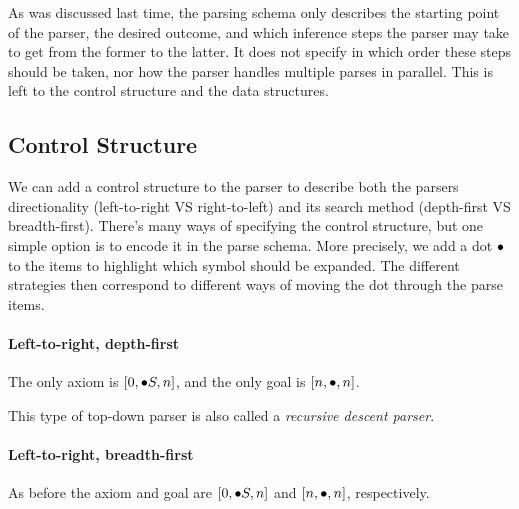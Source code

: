 As was discussed last time, the parsing schema only describes the starting point of the parser, the desired outcome, and which inference steps the parser may take to get from the former to the latter.
It does not specify in which order these steps should be taken, nor how the parser handles multiple parses in parallel.
This is left to the control structure and the data structures.

\subsection{Control Structure}
\label{sub:TopDown_Control}
We can add a control structure to the parser to describe both the parsers directionality (left-to-right VS right-to-left) and its search method (depth-first VS breadth-first).
There's many ways of specifying the control structure, but one simple option is to encode it in the parse schema.
More precisely, we add a dot $\psep$ to the items to highlight which symbol should be expanded.
The different strategies then correspond to different ways of moving the dot through the parse items.

\paragraph{Left-to-right, depth-first}
The only axiom is $[0,\psep S, n]$, and the only goal is $[n,\psep,n]$.
%
\begin{prooftree}
\end{prooftree}
%
\begin{prooftree}
\end{prooftree}
%
This type of top-down parser is also called a \emph{recursive descent parser}.

\paragraph{Left-to-right, breadth-first}
As before the axiom and goal are $[0,\psep S,n]$ and $[n,\psep,n]$, respectively.
%
\begin{prooftree}
\end{prooftree}
%
\begin{prooftree}
\end{prooftree}

